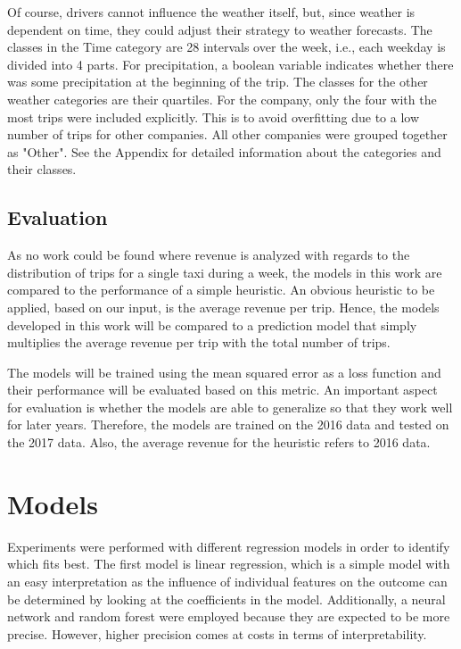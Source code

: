 \documentclass[twoside,11pt]{article}
\begin{document}
Of course, drivers cannot influence the weather itself, but, since weather is dependent on time, they could adjust their strategy to weather forecasts. The classes in the Time category are 28 intervals over the week, i.e., each weekday is divided into 4 parts. For precipitation, a boolean variable indicates whether there was some precipitation at the beginning of the trip. The classes for the other weather categories are their quartiles. For the company, only the four with the most trips were included explicitly. This is to avoid overfitting due to a low number of trips for other companies. All other companies were grouped together as "Other". See the Appendix for detailed information about the categories and their classes.

\subsection{Evaluation} \label{sec:eval}

As no work could be found where revenue is analyzed with regards to the distribution of trips for a single taxi during a week, the models in this work are compared to the performance of a simple heuristic. An obvious heuristic to be applied, based on our input, is the average revenue per trip. Hence, the models developed in this work will be compared to a prediction model that simply multiplies the average revenue per trip with the total number of trips.\par

The models will be trained using the mean squared error as a loss function and their performance will be evaluated based on this metric. An important aspect for evaluation is whether the models are able to generalize so that they work well for later years. Therefore, the models are trained on the 2016 data and tested on the 2017 data. Also, the average revenue for the heuristic refers to 2016 data.

\section{Models} \label{model}

Experiments were performed with different regression models in order to identify which fits best. The first model is linear regression, which is a simple model with an easy interpretation as the influence of individual features on the outcome can be determined by looking at the coefficients in the model. Additionally, a neural network and random forest were employed because they are expected to be more precise. However, higher precision comes at costs in terms of interpretability.
\end{document}
